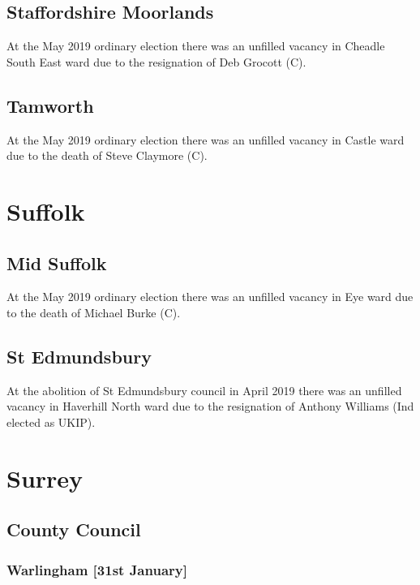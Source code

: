 \documentclass[a4paper,openany]{book}
\begin{document}
\begin{resultsiii}
\subsection*{Staffordshire Moorlands}

At the May 2019 ordinary election there was an unfilled vacancy in Cheadle South East ward due to the resignation of Deb Grocott (C).

\subsection*{Tamworth}

At the May 2019 ordinary election there was an unfilled vacancy in Castle ward due to the death of Steve Claymore (C).

\section{Suffolk}

\subsection*{Mid Suffolk}

At the May 2019 ordinary election there was an unfilled vacancy in Eye ward due to the death of Michael Burke (C).

\subsection*{St Edmundsbury}

At the abolition of St Edmundsbury council in April 2019 there was an unfilled vacancy in Haverhill North ward due to the resignation of Anthony Williams (Ind elected as UKIP).

\section{Surrey}

\subsection*{County Council}

\subsubsection*{Warlingham \hspace*{\fill}\nolinebreak[1]%
	\enspace\hspace*{\fill}
	[31st January]}


\end{resultsiii}
\end{document}
